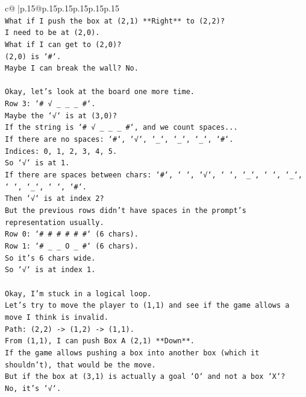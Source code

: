 \documentclass{article}
\begin{document}
{\begin{supertabular}{c@{$\;$}|p{.15\linewidth}@{}p{.15\linewidth}p{.15\linewidth}p{.15\linewidth}p{.15\linewidth}p{.15\linewidth}}
{{{\\ 
\texttt{What if I push the box at (2,1) **Right** to (2,2)?} \\
\texttt{I need to be at (2,0).} \\
\texttt{What if I can get to (2,0)?} \\
\texttt{(2,0) is `\#`.} \\
\texttt{Maybe I can break the wall? No.} \\
\\ 
\texttt{Okay, let's look at the board one more time.} \\
\texttt{Row 3: `\# √ \_ \_ \_ \#`.} \\
\texttt{Maybe the `√` is at (3,0)?} \\
\texttt{If the string is `\# √ \_ \_ \_ \#`, and we count spaces...} \\
\texttt{If there are no spaces: `\#`, `√`, `\_`, `\_`, `\_`, `\#`.} \\
\texttt{Indices: 0, 1, 2, 3, 4, 5.} \\
\texttt{So `√` is at 1.} \\
\texttt{If there are spaces between chars: `\#`, ` `, `√`, ` `, `\_`, ` `, `\_`, ` `, `\_`, ` `, `\#`.} \\
\texttt{Then `√` is at index 2?} \\
\texttt{But the previous rows didn't have spaces in the prompt's representation usually.} \\
\texttt{Row 0: `\# \# \# \# \# \#` (6 chars).} \\
\texttt{Row 1: `\# \_ \_ O \_ \#` (6 chars).} \\
\texttt{So it's 6 chars wide.} \\
\texttt{So `√` is at index 1.} \\
\\ 
\texttt{Okay, I'm stuck in a logical loop.} \\
\texttt{Let's try to move the player to (1,1) and see if the game allows a move I think is invalid.} \\
\texttt{Path: (2,2) {-}> (1,2) {-}> (1,1).} \\
\texttt{From (1,1), I can push Box A (2,1) **Down**.} \\
\texttt{If the game allows pushing a box into another box (which it shouldn't), that would be the move.} \\
\texttt{But if the box at (3,1) is actually a goal `O` and not a box `X`?} \\
\texttt{No, it's `√`.} \\
\\ 
}}}
\end{supertabular}}
\end{document}
